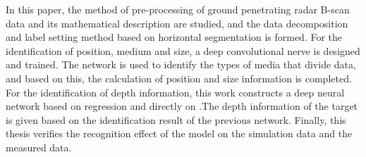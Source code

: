 \begin{englishabstract}
	In this paper, the method of pre-processing of ground penetrating radar B-scan data and its mathematical description are studied, and the data decomposition and label setting method based on horizontal segmentation is formed. For the identification of position, medium and size, a deep convolutional nerve is designed and trained. The network is used to identify the types of media that divide data, and based on this, the calculation of position and size information is completed. For the identification of depth information, this work constructs a deep neural network based on regression and directly on .The depth information of the target is given based on the identification result of the previous network. Finally, this thesis verifies the recognition effect of the model on the simulation data and the measured data.
	
\end{englishabstract}


